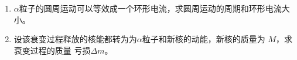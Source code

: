 \begin{enumerate}
\begin{enumerate}
\item 
$ \alpha $粒子的圆周运动可以等效成一个环形电流，求圆周运动的周期和环形电流大小。

\item 
设该衰变过程释放的核能都转为为$ \alpha $粒子和新核的动能，新核的质量为 $ M $，求衰变过程的质量
亏损$ \Delta m $。

	
\end{enumerate}







	
	
	
\end{enumerate}

